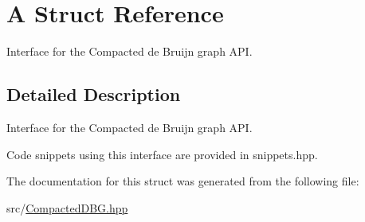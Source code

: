 \hypertarget{structA}{}\section{A Struct Reference}
\label{structA}


Interface for the Compacted de Bruijn graph A\+PI.  




\subsection{Detailed Description}
Interface for the Compacted de Bruijn graph A\+PI. 

Code snippets using this interface are provided in snippets.\+hpp. 

The documentation for this struct was generated from the following file\+:\begin{DoxyCompactItemize}
\item 
src/\hyperlink{CompactedDBG_8hpp}{Compacted\+D\+B\+G.\+hpp}\end{DoxyCompactItemize}
